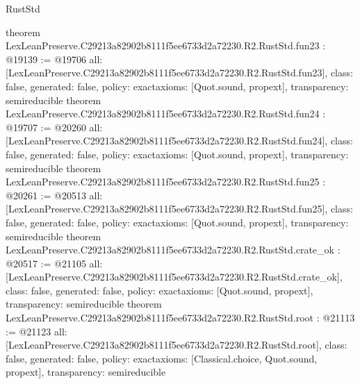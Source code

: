 \begin{lexlean}{RustStd}
\begin{coremodule}
{}
theorem LexLeanPreserve.C29213a82902b8111f5ee6733d2a72230.R2.RustStd.fun23 : @19139 := @19706 {
  all: [LexLeanPreserve.C29213a82902b8111f5ee6733d2a72230.R2.RustStd.fun23],
  class: false,
  generated: false,
  policy: exact{axioms: [Quot.sound, propext]},
  transparency: semireducible
}
theorem LexLeanPreserve.C29213a82902b8111f5ee6733d2a72230.R2.RustStd.fun24 : @19707 := @20260 {
  all: [LexLeanPreserve.C29213a82902b8111f5ee6733d2a72230.R2.RustStd.fun24],
  class: false,
  generated: false,
  policy: exact{axioms: [Quot.sound, propext]},
  transparency: semireducible
}
theorem LexLeanPreserve.C29213a82902b8111f5ee6733d2a72230.R2.RustStd.fun25 : @20261 := @20513 {
  all: [LexLeanPreserve.C29213a82902b8111f5ee6733d2a72230.R2.RustStd.fun25],
  class: false,
  generated: false,
  policy: exact{axioms: [Quot.sound, propext]},
  transparency: semireducible
}
theorem LexLeanPreserve.C29213a82902b8111f5ee6733d2a72230.R2.RustStd.crate_ok : @20517 := @21105 {
  all: [LexLeanPreserve.C29213a82902b8111f5ee6733d2a72230.R2.RustStd.crate_ok],
  class: false,
  generated: false,
  policy: exact{axioms: [Quot.sound, propext]},
  transparency: semireducible
}
theorem LexLeanPreserve.C29213a82902b8111f5ee6733d2a72230.R2.RustStd.root : @21113 := @21123 {
  all: [LexLeanPreserve.C29213a82902b8111f5ee6733d2a72230.R2.RustStd.root],
  class: false,
  generated: false,
  policy: exact{axioms: [Classical.choice, Quot.sound, propext]},
  transparency: semireducible
}


\end{coremodule}
\end{lexlean}
